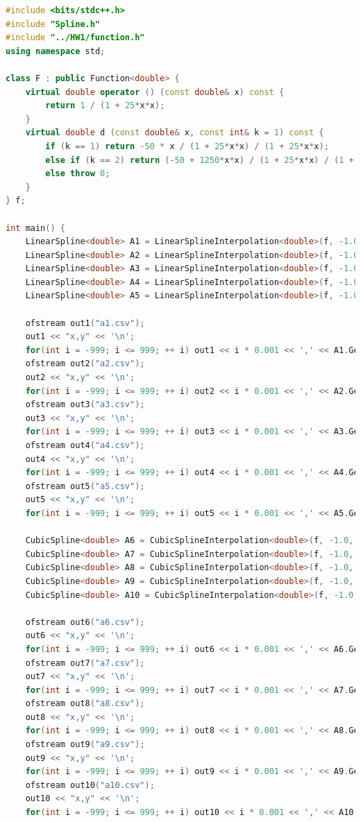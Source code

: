 \documentclass{ctexart}
\begin{document}
\begin{lstlisting}[language={c++}]
#include <bits/stdc++.h>
#include "Spline.h"
#include "../HW1/function.h"
using namespace std;

class F : public Function<double> {
	virtual double operator () (const double& x) const {
		return 1 / (1 + 25*x*x);
	}
	virtual double d (const double& x, const int& k = 1) const {
		if (k == 1) return -50 * x / (1 + 25*x*x) / (1 + 25*x*x);
		else if (k == 2) return (-50 + 1250*x*x) / (1 + 25*x*x) / (1 + 25*x*x) / (1 + 25*x*x);
		else throw 0;
	}
} f;

int main() {
	LinearSpline<double> A1 = LinearSplineInterpolation<double>(f, -1.0, 1.0, 5);
	LinearSpline<double> A2 = LinearSplineInterpolation<double>(f, -1.0, 1.0, 10);
	LinearSpline<double> A3 = LinearSplineInterpolation<double>(f, -1.0, 1.0, 20);
	LinearSpline<double> A4 = LinearSplineInterpolation<double>(f, -1.0, 1.0, 40);
	LinearSpline<double> A5 = LinearSplineInterpolation<double>(f, -1.0, 1.0, 80);

	ofstream out1("a1.csv");
	out1 << "x,y" << '\n';
	for(int i = -999; i <= 999; ++ i) out1 << i * 0.001 << ',' << A1.GetValue(i * 0.001) << '\n';
	ofstream out2("a2.csv");
	out2 << "x,y" << '\n';
	for(int i = -999; i <= 999; ++ i) out2 << i * 0.001 << ',' << A2.GetValue(i * 0.001) << '\n';
	ofstream out3("a3.csv");
	out3 << "x,y" << '\n';
	for(int i = -999; i <= 999; ++ i) out3 << i * 0.001 << ',' << A3.GetValue(i * 0.001) << '\n';
	ofstream out4("a4.csv");
	out4 << "x,y" << '\n';
	for(int i = -999; i <= 999; ++ i) out4 << i * 0.001 << ',' << A4.GetValue(i * 0.001) << '\n';
	ofstream out5("a5.csv");
	out5 << "x,y" << '\n';
	for(int i = -999; i <= 999; ++ i) out5 << i * 0.001 << ',' << A5.GetValue(i * 0.001) << '\n';

	CubicSpline<double> A6 = CubicSplineInterpolation<double>(f, -1.0, 1.0, 5, "Complete");
	CubicSpline<double> A7 = CubicSplineInterpolation<double>(f, -1.0, 1.0, 10, "Complete");
	CubicSpline<double> A8 = CubicSplineInterpolation<double>(f, -1.0, 1.0, 20, "Complete");
	CubicSpline<double> A9 = CubicSplineInterpolation<double>(f, -1.0, 1.0, 40, "Complete");
	CubicSpline<double> A10 = CubicSplineInterpolation<double>(f, -1.0, 1.0, 80, "Complete");
	
	ofstream out6("a6.csv");
	out6 << "x,y" << '\n';
	for(int i = -999; i <= 999; ++ i) out6 << i * 0.001 << ',' << A6.GetValue(i * 0.001) << '\n';
	ofstream out7("a7.csv");
	out7 << "x,y" << '\n';
	for(int i = -999; i <= 999; ++ i) out7 << i * 0.001 << ',' << A7.GetValue(i * 0.001) << '\n';
	ofstream out8("a8.csv");
	out8 << "x,y" << '\n';
	for(int i = -999; i <= 999; ++ i) out8 << i * 0.001 << ',' << A8.GetValue(i * 0.001) << '\n';
	ofstream out9("a9.csv");
	out9 << "x,y" << '\n';
	for(int i = -999; i <= 999; ++ i) out9 << i * 0.001 << ',' << A9.GetValue(i * 0.001) << '\n';
	ofstream out10("a10.csv");
	out10 << "x,y" << '\n';
	for(int i = -999; i <= 999; ++ i) out10 << i * 0.001 << ',' << A10.GetValue(i * 0.001) << '\n';


\end{lstlisting}
\end{document}
